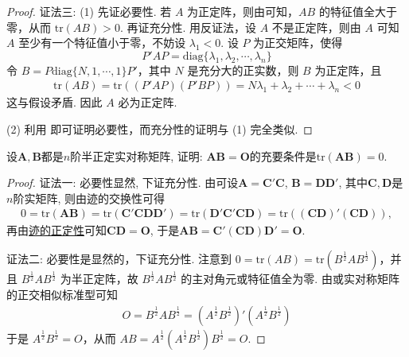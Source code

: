 \documentclass[../../main.tex]{subfiles}
\begin{document}
\begin{proof}
{\color{blue}证法三:}
(1) 先证必要性. 若 \(A\) 为正定阵，则由可知，\(AB\) 的特征值全大于零，从而 \(\mathrm{tr}(AB)>0\). 再证充分性. 用反证法，设 \(A\) 不是正定阵，则由 \(A\) 可知 \(A\) 至少有一个特征值小于零，不妨设 \(\lambda_1 < 0\). 设 \(P\) 为正交矩阵，使得
\[
P'AP = \mathrm{diag}\{\lambda_1,\lambda_2,\cdots,\lambda_n\}
\]
令 \(B = P\mathrm{diag}\{N,1,\cdots,1\}P'\)，其中 \(N\) 是充分大的正实数，则 \(B\) 为正定阵，且
\begin{align*}
\mathrm{tr}(AB) = \mathrm{tr}\left((P'AP)(P'BP)\right) = N\lambda_1 + \lambda_2 + \cdots + \lambda_n < 0
\end{align*}
这与假设矛盾. 因此 \(A\) 必为正定阵.

(2) 利用 即可证明必要性，而充分性的证明与 (1) 完全类似. 
\end{proof}

\begin{proposition}\label{proposition:A为实半正定阵AB=O的充要条件为tr(AB)=0}
设$\boldsymbol{A}, \boldsymbol{B}$都是$n$阶半正定实对称矩阵, 证明: $\boldsymbol{A}\boldsymbol{B}=\boldsymbol{O}$的充要条件是$\text{tr}(\boldsymbol{A}\boldsymbol{B}) = 0$.
\end{proposition}
\begin{proof}
{\color{blue}证法一:}
必要性显然, 下证充分性. 由可设$\boldsymbol{A}=\boldsymbol{C}'\boldsymbol{C}$, $\boldsymbol{B}=\boldsymbol{D}\boldsymbol{D}'$, 其中$\boldsymbol{C}, \boldsymbol{D}$是$n$阶实矩阵, 则由迹的交换性可得
\begin{align*}
0 = \text{tr}(\boldsymbol{A}\boldsymbol{B}) = \text{tr}(\boldsymbol{C}'\boldsymbol{C}\boldsymbol{D}\boldsymbol{D}') = \text{tr}(\boldsymbol{D}'\boldsymbol{C}'\boldsymbol{C}\boldsymbol{D}) = \text{tr}\left((\boldsymbol{C}\boldsymbol{D})'(\boldsymbol{C}\boldsymbol{D})\right),
\end{align*}
再由\hyperref[proposition:零矩阵的充要条件]{迹的正定性}可知$\boldsymbol{C}\boldsymbol{D}=\boldsymbol{O}$, 于是$\boldsymbol{A}\boldsymbol{B}=\boldsymbol{C}'(\boldsymbol{C}\boldsymbol{D})\boldsymbol{D}'=\boldsymbol{O}$. 

{\color{blue}证法二:}
必要性是显然的，下证充分性. 注意到 \(0 = \mathrm{tr}(AB) = \mathrm{tr}(B^{\frac{1}{2}}AB^{\frac{1}{2}})\)，并且 \(B^{\frac{1}{2}}AB^{\frac{1}{2}}\) 为半正定阵，故 \(B^{\frac{1}{2}}AB^{\frac{1}{2}}\) 的主对角元或特征值全为零. 由或实对称矩阵的正交相似标准型可知
\begin{align*}
O = B^{\frac{1}{2}}AB^{\frac{1}{2}} = (A^{\frac{1}{2}}B^{\frac{1}{2}})'(A^{\frac{1}{2}}B^{\frac{1}{2}})
\end{align*}
于是 \(A^{\frac{1}{2}}B^{\frac{1}{2}} = O\)，从而 \(AB = A^{\frac{1}{2}}(A^{\frac{1}{2}}B^{\frac{1}{2}})B^{\frac{1}{2}} = O\). 
\end{proof}
\end{document}
